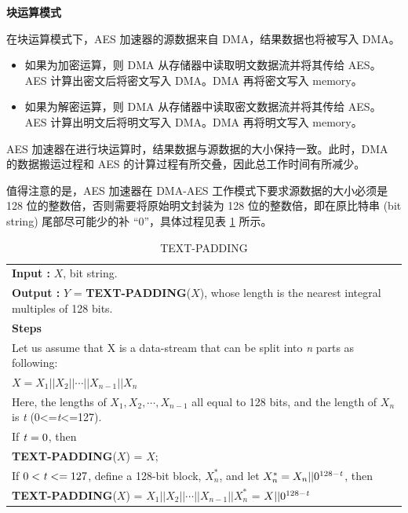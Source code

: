 \documentclass[main\_\_CN.tex]{subfiles}
\begin{document}
\textbf{块运算模式}

在块运算模式下，AES 加速器的源数据来自 DMA，结果数据也将被写入 DMA。
\begin{itemize}
    \item 如果为加密运算，则 DMA 从存储器中读取明文数据流并将其传给 AES。AES 计算出密文后将密文写入 DMA。DMA 再将密文写入 memory。
    \item 如果为解密运算，则 DMA 从存储器中读取密文数据流并将其传给 AES。AES 计算出明文后将明文写入 DMA。DMA 再将明文写入 memory。
\end{itemize}

AES 加速器在进行块运算时，结果数据与源数据的大小保持一致。此时，DMA 的数据搬运过程和 AES 的计算过程有所交叠，因此总工作时间有所减少。

\label{api:testpadding}值得注意的是，AES 加速器在 DMA-AES 工作模式下要求源数据的大小必须是 128 位的整数倍，否则需要将原始明文封装为 128 位的整数倍，即在原比特串 (bit string) 尾部尽可能少的补 “0”，具体过程见表 \ref{tab:aes-define-func-text-padding} 所示。

\clearpage
\begin{longtable}[c]{|p{15cm}|}
\caption{TEXT-PADDING} 
\label{tab:aes-define-func-text-padding}\\
\hline
\rowcolor{lightgray}
\multirow{1}{*}{%
{\bfseries Function :} {\bfseries TEXT-PADDING}(\ ) } \\\hline
{\bfseries Input\phantom{aaa} :} $X$, bit string.\\
{\bfseries Output\phantom{a~} :} $Y$ = {\bfseries TEXT-PADDING}($X$), whose length is the nearest integral multiples of 128 bits. \\\hline
{\bfseries Steps\phantom{aa~}  }\\
\hspace{1.3cm} Let us assume that X is a data-stream that can be split into {\it{n}} parts as following: \\
\phantom{aaaaaaaa}$X = X_{1} || X_{2} || \cdots || X_{n-1} || X_{n}$ \\ 
\phantom{aaaaaaaa}Here, the lengths of $X_{1}, X_{2}, \cdots, X_{n-1}$ all equal to 128 bits, and the length of $X_{n}$ is {\it{t}} (0<={\it{t}}<=127).\\
\phantom{aaaaaaaa}If ${\it{t}} = 0$, then\\
\phantom{aaaaaaaa}\phantom{空空空空空} {\bfseries TEXT-PADDING}($X$) = $X$;\\
\phantom{aaaaaaaa}If $0<{\it{t}} <= 127$, define a 128-bit block, $X_{n}^{*}$, and let $X_{n}^{*} = X_{n} || 0^{128-{\it{t}}}$, then\\
\phantom{aaaaaaaa}\phantom{空空空空空} {\bfseries TEXT-PADDING}($X$) = $X_{1} || X_{2} || \cdots || X_{n-1} || X_{n}^{*}$  = $X || 0^{128-{\it{t}}}$\\
\hline
\end{longtable}
\end{document}
